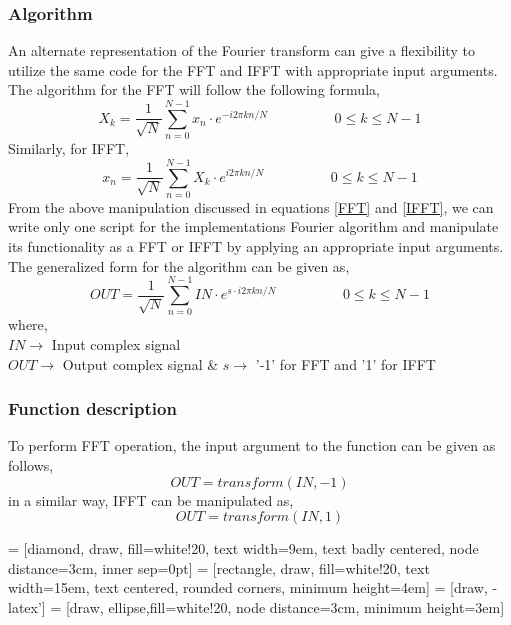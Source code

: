 \subsubsection{Algorithm}
An alternate representation of the Fourier transform can give a flexibility to utilize the same code for the FFT and IFFT with appropriate input arguments. The algorithm for the FFT will follow the following formula,
\begin{equation}
X_k =\frac{1}{\sqrt{N}} \sum\limits_{n=0}^{N-1} x_n \cdot e^{-i2\pi kn/N}		\hspace{2cm}	0\leq k \leq N-1 
\label{FFT}
\end{equation}
Similarly, for IFFT,
\begin{equation}
x_n =\frac{1}{\sqrt{N}} \sum\limits_{n=0}^{N-1} X_k \cdot e^{i2\pi kn/N}		\hspace{2cm}	0\leq k \leq N-1 
\label{IFFT}
\end{equation}
From the above manipulation discussed in equations \ref{FFT} and \ref{IFFT}, we can write only one script for the implementations Fourier algorithm and manipulate its functionality as a FFT or IFFT by applying an appropriate input arguments. \\
The generalized form for the algorithm can be given as,
\begin{equation}
OUT =\frac{1}{\sqrt{N}} \sum\limits_{n=0}^{N-1} IN \cdot e^{s \cdot i2\pi kn/N}		\hspace{2cm}	0\leq k \leq N-1 
\label{FT}
\end{equation}
where,\\
$IN \rightarrow$ {Input complex signal}\\
$OUT \rightarrow$ {Output complex signal} \& $s \rightarrow$ {'-1' for FFT and '1' for IFFT}\\

\subsubsection{Function description}
To perform FFT operation, the input argument to the function can be given as follows,
\begin{equation*}
OUT = transform(IN,-1)
\end{equation*}
in a similar way, IFFT can be manipulated as,
\begin{equation*}
OUT = transform(IN,1)
\end{equation*}

\newpage
 = [diamond, draw, fill=white!20, 
text width=9em, text badly centered, node distance=3cm, inner sep=0pt]
 = [rectangle, draw, fill=white!20, 
text width=15em, text centered, rounded corners, minimum height=4em]
 = [draw, -latex']
 = [draw, ellipse,fill=white!20, node distance=3cm,
minimum height=3em]

